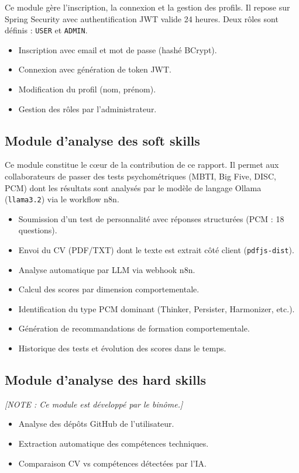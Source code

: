 \documentclass[12pt,a4paper]{report}
\begin{document}
Ce module gère l'inscription, la connexion et la gestion des profils. Il repose sur Spring
Security avec authentification JWT valide 24 heures. Deux rôles sont définis : \texttt{USER}
et \texttt{ADMIN}.

\begin{itemize}
  \item Inscription avec email et mot de passe (hashé BCrypt).
  \item Connexion avec génération de token JWT.
  \item Modification du profil (nom, prénom).
  \item Gestion des rôles par l'administrateur.
\end{itemize}

\subsection{Module d'analyse des soft skills}

Ce module constitue le cœur de la contribution de ce rapport. Il permet aux collaborateurs de
passer des tests psychométriques (MBTI, Big Five, DISC, PCM) dont les résultats sont analysés
par le modèle de langage Ollama (\texttt{llama3.2}) via le workflow n8n.

\begin{itemize}
  \item Soumission d'un test de personnalité avec réponses structurées (PCM : 18 questions).
  \item Envoi du CV (PDF/TXT) dont le texte est extrait côté client (\texttt{pdfjs-dist}).
  \item Analyse automatique par LLM via webhook n8n.
  \item Calcul des scores par dimension comportementale.
  \item Identification du type PCM dominant (Thinker, Persister, Harmonizer, etc.).
  \item Génération de recommandations de formation comportementale.
  \item Historique des tests et évolution des scores dans le temps.
\end{itemize}

\subsection{Module d'analyse des hard skills}
\textit{[NOTE : Ce module est développé par le binôme.]}
\begin{itemize}
  \item Analyse des dépôts GitHub de l'utilisateur.
  \item Extraction automatique des compétences techniques.
  \item Comparaison CV vs compétences détectées par l'IA.
\end{itemize}
\end{document}
